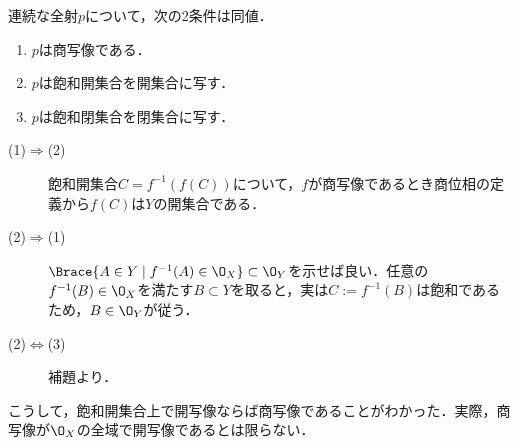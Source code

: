 \documentclass[uplatex,dvipdfmx]{jsreport}
\begin{document}
\begin{proposition}[連続全射が商写像になるための必要十分条件]
    連続な全射$p$について，次の2条件は同値．
    \begin{enumerate}
        \item $p$は商写像である．
        \item $p$は飽和開集合を開集合に写す．
        \item $p$は飽和閉集合を閉集合に写す．
    \end{enumerate}
\end{proposition}
\begin{Proof}\mbox{}
    \begin{description}
        \item[(1)$\Rightarrow$(2)] 飽和開集合$C=f^{-1}(f(C))$について，$f$が商写像であるとき商位相の定義から$f(C)$は$Y$の開集合である．
        \item[(2)$\Rightarrow$(1)] $\Brace{A\in Y\mid f^{-1}(A)\in\O_X}\subset\O_Y$を示せば良い．任意の$f^{-1}(B)\in\O_X$を満たす$B\subset Y$を取ると，実は$C:=f^{-1}(B)$は飽和であるため，$B\in\O_Y$が従う．
        \item[(2)$\Leftrightarrow$(3)] 補題より． 
    \end{description}
\end{Proof}
\begin{remarks}
    こうして，飽和開集合上で開写像ならば商写像であることがわかった．実際，商写像が$\O_X$の全域で開写像であるとは限らない．
\end{remarks}
\end{document}
